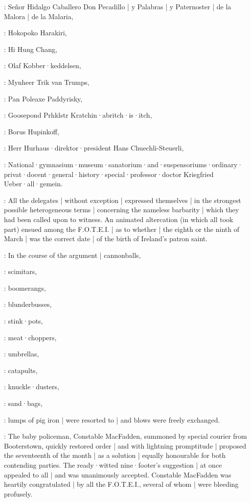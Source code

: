 :
Señor Hidalgo Caballero Don Pecadillo |
y Palabras |
y Paternoster |
de la Malora |
de la Malaria,

:
Hokopoko Harakiri,

:
Hi Hung Chang,

:
Olaf Kobber·keddelsen,

:
Mynheer Trik van Trumps,

:
Pan Poleaxe Paddyrisky,

:
Goosepond Prhklstr Kratchin·abritch·is·itch,

:
Borus Hupinkoff,

:
Herr Hurhaus·direktor·president Hans Chuechli-Steuerli,

:
National·gymnasium·museum·sanatorium·and·suspensoriums·ordinary·%
privat·docent·general·history·special·professor·doctor
Kriegfried Ueber·all·gemein.

:
All the delegates |
without exception |
expressed themselves |
in the strongest possible heterogeneous terms
 |
concerning the nameless barbarity |
which they had been called upon to witness.
An animated altercation
(in which all took part)
ensued among the F.O.T.E.I. |
as to whether |
the eighth or the ninth of March |
was the correct date |
of the birth of Ireland's patron saint.

:
In the course of the argument |
cannonballs,

:
scimitars,

:
boomerangs,

:
blunderbusses,

:
stink·pots,

:
meat·choppers,

:
umbrellas,

:
catapults,

:
knuckle·dusters,

:
sand·bags,

:
lumps of pig iron |
were resorted to |
and blows were freely exchanged.

:
The baby policeman,
Constable MacFadden,
summoned by special courier from Booterstown,
quickly restored order |
and with lightning promptitude |
proposed the seventeenth of the month
 |
as a solution |
equally honourable for both contending parties.
The ready·witted nine·footer's suggestion |
at once appealed to all |
and was unanimously accepted.
Constable MacFadden was heartily congratulated |
by all the F.O.T.E.I.,
several of whom |
were bleeding profusely.

